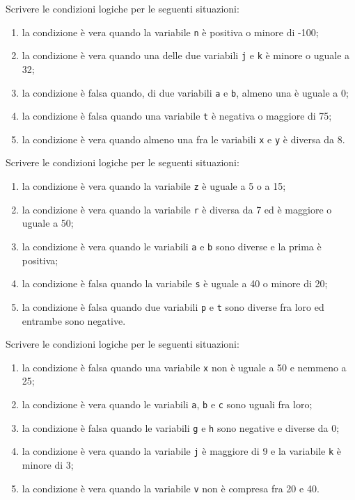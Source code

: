 \begin{exercise}
	Scrivere le condizioni logiche per le seguenti situazioni:
	\begin{enumerate}
		\item la condizione è vera quando la variabile \texttt{n} è positiva o minore di -100;
		\item la condizione è vera quando una delle due variabili \texttt{j} e \texttt{k} è minore o uguale a 32;
		\item la condizione è falsa quando, di due variabili \texttt{a} e \texttt{b}, almeno una è uguale a 0;
		\item la condizione è falsa quando una variabile \texttt{t} è negativa o maggiore di 75;
		\item la condizione è vera quando almeno una fra le variabili \texttt{x} e \texttt{y} è diversa da 8.
	\end{enumerate}
\end{exercise}

\begin{exercise}
	Scrivere le condizioni logiche per le seguenti situazioni:
	\begin{enumerate}
		\item la condizione è vera quando la variabile \texttt{z} è uguale a 5 o a 15;
		\item la condizione è vera quando la variabile \texttt{r} è diversa da 7 ed è maggiore o uguale a 50;
		\item la condizione è vera quando le variabili \texttt{a} e \texttt{b} sono diverse e la prima è positiva;
		\item la condizione è falsa quando la variabile \texttt{s} è uguale a 40 o minore di 20;
		\item la condizione è falsa quando due variabili \texttt{p} e \texttt{t} sono diverse fra loro ed entrambe sono negative.
	\end{enumerate}
\end{exercise}

\begin{exercise}
	Scrivere le condizioni logiche per le seguenti situazioni:
		\begin{enumerate}
			\item la condizione è falsa quando una variabile \texttt{x} non è uguale a 50 e nemmeno a 25;
			\item la condizione è vera quando le variabili \texttt{a}, \texttt{b} e \texttt{c} sono uguali fra loro;
			\item la condizione è falsa quando le variabili \texttt{g} e \texttt{h} sono negative e diverse da 0;
			\item la condizione è vera quando la variabile \texttt{j} è maggiore di 9 e la variabile \texttt{k} è minore di 3;
			\item la condizione è vera quando la variabile \texttt{v} non è compresa fra 20 e 40.
		\end{enumerate}
\end{exercise}

